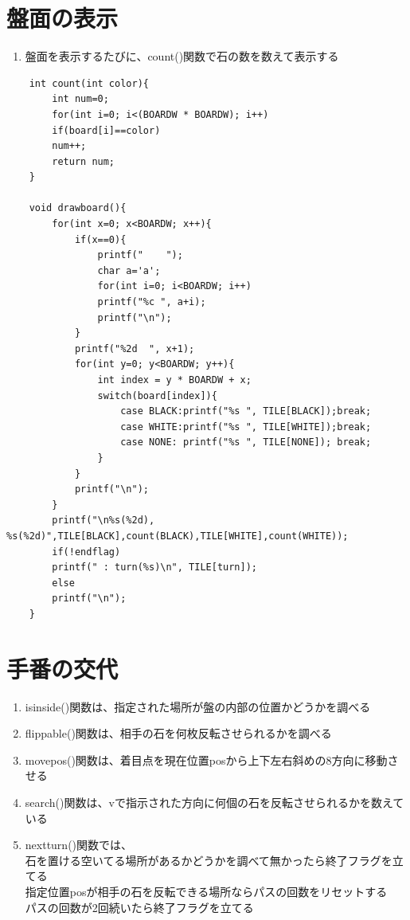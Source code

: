 \documentclass[uplatex,a4paper,11pt,oneside,openany]{jsbook}
\begin{document}
\section{盤面の表示}

\begin{enumerate}
	\item 盤面を表示するたびに、count()関数で石の数を数えて表示する
\end{enumerate}

\begin{lstlisting}
	int count(int color){
		int num=0;
		for(int i=0; i<(BOARDW * BOARDW); i++)
		if(board[i]==color)
		num++;
		return num;
	}
	
	void drawboard(){
		for(int x=0; x<BOARDW; x++){
			if(x==0){
				printf("    ");
				char a='a';
				for(int i=0; i<BOARDW; i++)
				printf("%c ", a+i);
				printf("\n");
			}
			printf("%2d  ", x+1);
			for(int y=0; y<BOARDW; y++){
				int index = y * BOARDW + x;
				switch(board[index]){
					case BLACK:printf("%s ", TILE[BLACK]);break;
					case WHITE:printf("%s ", TILE[WHITE]);break;
					case NONE: printf("%s ", TILE[NONE]); break;
				}
			}
			printf("\n");
		}
		printf("\n%s(%2d), %s(%2d)",TILE[BLACK],count(BLACK),TILE[WHITE],count(WHITE));
		if(!endflag)
		printf(" : turn(%s)\n", TILE[turn]);
		else
		printf("\n");
	}
\end{lstlisting}

\section{手番の交代}

\begin{enumerate}
	\item isinside()関数は、指定された場所が盤の内部の位置かどうかを調べる
	\item flippable()関数は、相手の石を何枚反転させられるかを調べる
	\item movepos()関数は、着目点を現在位置posから上下左右斜めの8方向に移動させる
	\item search()関数は、vで指示された方向に何個の石を反転させられるかを数えている
	\item nextturn()関数では、\\石を置ける空いてる場所があるかどうかを調べて無かったら終了フラグを立てる\\
	指定位置posが相手の石を反転できる場所ならパスの回数をリセットする\\
	パスの回数が2回続いたら終了フラグを立てる
\end{enumerate}
\end{document}
